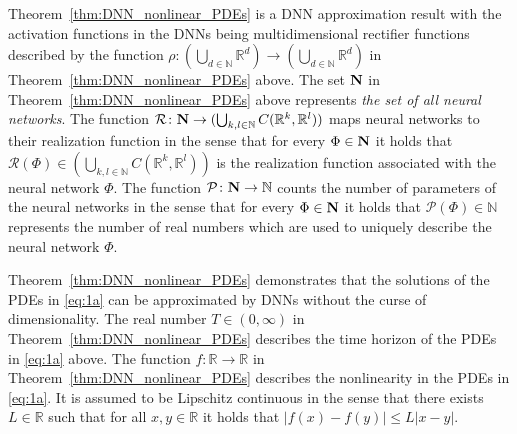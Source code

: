\documentclass[12pt]{article}
\theoremstyle{definition}
\newcommand{\R}{\mathbb{R}}
\newcommand{\N}{\mathbb{N}}
\begin{document}
Theorem~\ref{thm:DNN_nonlinear_PDEs} is a DNN approximation result 
with the activation functions in the DNNs being multidimensional rectifier functions 
described by the function 
$ \rho \colon (\bigcup_{d\in\N}\R^d) \to (\bigcup_{d\in\N}\R^d) $ 
in Theorem~\ref{thm:DNN_nonlinear_PDEs} above. 
The set $ {\bf N} $ in Theorem~\ref{thm:DNN_nonlinear_PDEs} above 
represents \emph{the set of all neural networks}. 
The function 
$ 
  \mathcal{R} \colon {\bf N} \to 
  ( \bigcup_{ k, l \in \N } C( \R^k, \R^l ) ) 
$ 
maps neural networks to their realization function in the sense that for every 
$ \Phi \in {\bf N} $ 
it holds that 
$
  \mathcal{R}( \Phi )
  \in 
  ( \bigcup_{ k, l \in \N } C( \R^k, \R^l ) ) 
$
is the realization function associated with the neural network $ \Phi $. 
The function 
$
  \mathcal{P} \colon {\bf N} \to \N 
$ 
counts the number of parameters of the neural networks 
in the sense that for every 
$ \Phi \in {\bf N} $ 
it holds that 
$
  \mathcal{P}( \Phi ) \in \N
$
represents the number of real numbers which are used 
to uniquely describe the neural network $ \Phi $. 



Theorem~\ref{thm:DNN_nonlinear_PDEs} demonstrates that the solutions 
of the PDEs in \eqref{eq:1a} can be approximated by DNNs 
without the curse of dimensionality. 
The real number $ T \in (0,\infty) $ in Theorem~\ref{thm:DNN_nonlinear_PDEs} describes 
the time horizon of the PDEs in \eqref{eq:1a} above. 
The function $ f \colon \R \to \R $ in Theorem~\ref{thm:DNN_nonlinear_PDEs} 
describes the nonlinearity 
in the PDEs in \eqref{eq:1a}. 
It is assumed to be Lipschitz continuous in the sense that there exists 
$ L \in \R $ such that for all $ x, y \in \R $ it holds that 
$ | f(x) - f(y) | \leq L | x - y | $. 
\end{document}
